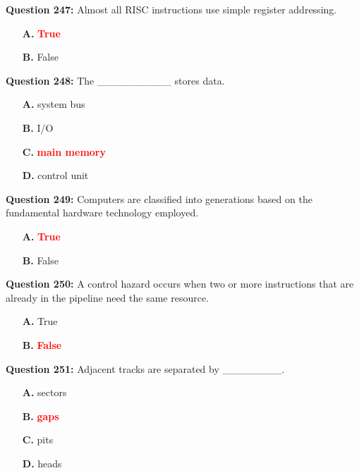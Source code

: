 \documentclass[12pt,a4paper]{article}
\begin{document}
\textbf{Question 247:} Almost all RISC instructions use simple register addressing.

\begin{itemize}
    \item[\textbf{A.}] \textcolor{red}{\textbf{True}}
    \item[\textbf{B.}] False
\end{itemize}

\vspace{0.5cm}

\textbf{Question 248:} The __________ stores data.

\begin{itemize}
    \item[\textbf{A.}] system bus
    \item[\textbf{B.}] I/O
    \item[\textbf{C.}] \textcolor{red}{\textbf{main memory}}
    \item[\textbf{D.}] control unit
\end{itemize}

\vspace{0.5cm}

\textbf{Question 249:} Computers are classified into generations based on the fundamental hardware technology employed.

\begin{itemize}
    \item[\textbf{A.}] \textcolor{red}{\textbf{True}}
    \item[\textbf{B.}] False
\end{itemize}

\vspace{0.5cm}

\textbf{Question 250:} A control hazard occurs when two or more instructions that are already in the pipeline need the same resource.

\begin{itemize}
    \item[\textbf{A.}] True
    \item[\textbf{B.}] \textcolor{red}{\textbf{False}}
\end{itemize}

\vspace{0.5cm}

\textbf{Question 251:} Adjacent tracks are separated by ________.

\begin{itemize}
    \item[\textbf{A.}] sectors
    \item[\textbf{B.}] \textcolor{red}{\textbf{gaps}}
    \item[\textbf{C.}] pits
    \item[\textbf{D.}] heads
\end{itemize}
\end{document}
